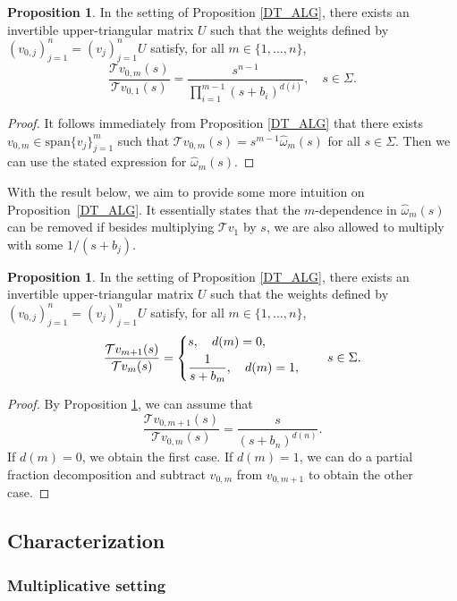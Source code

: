 \documentclass[a4paper,12pt,oneside]{article}
\theoremstyle{definition}
\newtheorem{prop}[defi]{Proposition}
\newcommand{\om}{\omega}
\newcommand{\spn}[1]{\text{span}\{#1\}}
\newcommand{\T}[1]{\mathcal{T}#1}
\begin{document}
\begin{prop} \label{DT_ALG_COMP}  
    In the setting of Proposition \ref{DT_ALG}, there exists an invertible upper-triangular matrix $U$ such that the weights defined by $(v_{0,j})_{j=1}^{n} = (v_j)_{j=1}^{n} U$ satisfy, for all $m\in\{1,\dots,n\}$,
        $$ \frac{\T{v_{0,m}}(s)}{\T{v_{0,1}}(s)} = \frac{s^{n-1}}{\prod_{i=1}^{m-1}(s+b_i)^{d(i)}},\quad s\in\Sigma.$$
\end{prop}
\begin{proof}
    It follows immediately from Proposition \ref{DT_ALG} that there exists $v_{0,m}\in\spn{v_j}_{j=1}^m$ such that $\T{v_{0,m}}(s) = s^{m-1} \hat{\om}_m(s)$ for all $s\in\Sigma$. Then we can use the stated expression for $\hat{\om}_m(s)$.
\end{proof}

With the result below, we aim to provide some more intuition on Proposition~\ref{DT_ALG}. It essentially states that the $m$-dependence in $\hat{\om}_m(s)$ can be removed if besides multiplying $\T{v_1}$ by $s$, we are also allowed to multiply with some $1/(s+b_j)$.

\begin{prop} \label{DT_ALG_CONSEC}
    In the setting of Proposition \ref{DT_ALG}, there exists an invertible upper-triangular matrix $U$ such that the weights defined by $(v_{0,j})_{j=1}^{n} = (v_j)_{j=1}^{n} U$ satisfy, for all $m\in\{1,\dots,n\}$,
        $$ \frac{\T{v}_{m+1}(s)}{\T{v}_m(s)} = \begin{dcases}
            s,\quad d(m)=0,\\
            \frac{1}{s+b_m},\quad d(m) = 1,
        \end{dcases}\qquad s\in\Sigma. $$
\end{prop}
\begin{proof}
    By Proposition \ref{DT_ALG_COMP}, we can assume that 
        $$ \frac{\T{v}_{0,m+1}(s)}{\T{v}_{0,m}(s)} = \frac{s}{(s+b_n)^{d(n)}}.$$
    If $d(m)=0$, we obtain the first case. If $d(m)=1$, we can do a partial fraction decomposition and subtract $v_{0,m}$ from $v_{0,m+1}$ to obtain the other case.    
\end{proof}




\subsection{Characterization} \label{CLASS}

\subsubsection{Multiplicative setting} \label{CLASS_M}
\end{document}
